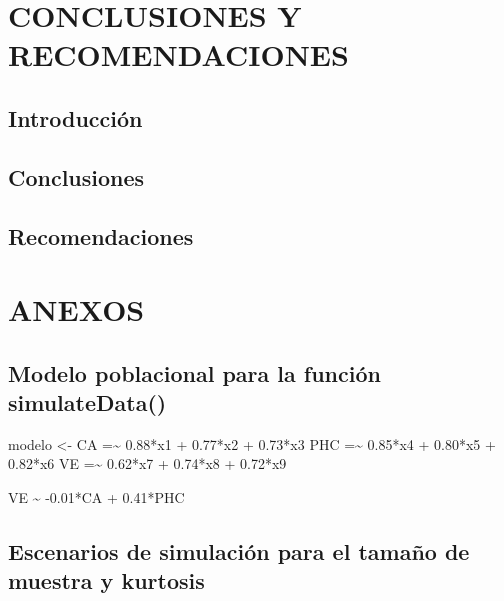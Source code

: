 \documentclass[
]{article}
\newenvironment{Shaded}{\begin{snugshade}}{\end{snugshade}}
\newcommand{\NormalTok}[1]{#1}
\newcommand{\StringTok}[1]{\textcolor[rgb]{0.31,0.60,0.02}{#1}}
\begin{document}
\newpage

\section{CONCLUSIONES Y RECOMENDACIONES}

\subsection{Introducción}

\subsection{Conclusiones}

\subsection{Recomendaciones}

\newpage

\section{ANEXOS}

\subsection{Modelo poblacional para la función simulateData()}

\label{modelo}

\begin{Shaded}
\begin{Highlighting}[]
\NormalTok{modelo \textless{}{-}}\StringTok{ \textquotesingle{} CA =\textasciitilde{} 0.88*x1 + 0.77*x2 + 0.73*x3}
\StringTok{            PHC =\textasciitilde{} 0.85*x4 + 0.80*x5 + 0.82*x6}
\StringTok{            VE =\textasciitilde{} 0.62*x7 + 0.74*x8 + 0.72*x9}

\StringTok{            VE \textasciitilde{} {-}0.01*CA + 0.41*PHC}
\StringTok{          \textquotesingle{}}
\end{Highlighting}
\end{Shaded}

\subsection{Escenarios de simulación para el tamaño de muestra y kurtosis}

\label{escenarios}
\end{document}
